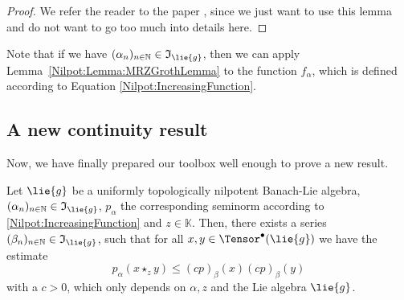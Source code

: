 \begin{proof}
	We refer the reader to the paper \cite{mitiagin.rolewicz.zelazko:1962a},
	since we just want to use this lemma and do not want to go too much into
	details here.
\end{proof}
Note that if we have $(\alpha_n)_{n \in \mathbb{N}} \in \mathfrak{I}_{\lie{g}}$, 
then we can apply Lemma~\ref{Nilpot:Lemma:MRZGrothLemma} to 
the function $f_{\alpha}$, which is defined according to Equation 
\ref{Nilpot:IncreasingFunction}.



\subsection{A new continuity result}

Now, we have finally prepared our toolbox well enough to prove a new result.
\begin{proposition}
	\label{Nilpot:Prop:TopNilBanachLie}
	Let $\lie{g}$ be a uniformly topologically nilpotent Banach-Lie algebra,
	$(\alpha_n)_{n \in \mathbb{N}} \in \mathfrak{I}_{\lie{g}}$, $p_{\alpha}$ the 
	corresponding seminorm according to \eqref{Nilpot:IncreasingFunction} and 
	$z \in \mathbb{K}$. Then, there exists a series $(\beta_n)_{n \in \mathbb{N}} 
	\in \mathfrak{I}_{\lie{g}}$, such that for all $x,y \in \Tensor^{\bullet}
	(\lie{g})$ we have the estimate
	\begin{equation}
		\label{Nilpot:TopNilBanachLie}
		p_{\alpha} \left(
			x \star_z y
		\right)
		\leq
		(c p)_{\beta} (x)
		(c p)_{\beta} (y)
	\end{equation}
	with a $c > 0$, which only depends on $\alpha, z$ and the Lie algebra 
	$\lie{g}$.
\end{proposition}
